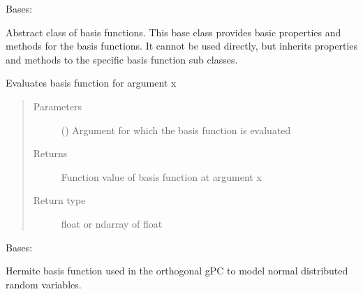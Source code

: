 \documentclass[letterpaper,10pt,english,openany,oneside]{sphinxmanual}
\begin{document}
\begin{fulllineitems}
\label{\detokenize{pygpc:pygpc.BasisFunction.BasisFunction}}
Bases: 

Abstract class of basis functions.
This base class provides basic properties and methods for the basis functions.
It cannot be used directly, but inherits properties and methods to the specific basis function sub classes.

\begin{fulllineitems}
\label{\detokenize{pygpc:pygpc.BasisFunction.BasisFunction.__call__}}
Evaluates basis function for argument x
\begin{quote}\begin{description}
\item[{Parameters}] \leavevmode
{} () \textendash{} Argument for which the basis function is evaluated

\item[{Returns}] \leavevmode
{} \textendash{} Function value of basis function at argument x

\item[{Return type}] \leavevmode
float or ndarray of float

\end{description}\end{quote}

\end{fulllineitems}


\end{fulllineitems}


\begin{fulllineitems}
\label{\detokenize{pygpc:pygpc.BasisFunction.Hermite}}
Bases: {\hyperref[\detokenize{pygpc:pygpc.BasisFunction.BasisFunction}]{}}

Hermite basis function used in the orthogonal gPC to model normal distributed random variables.

\end{fulllineitems}
\end{document}
